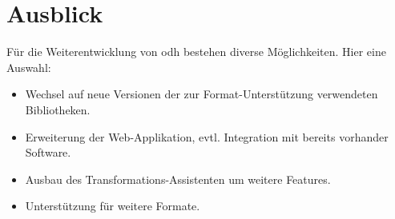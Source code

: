 \section*{Ausblick}
Für die Weiterentwicklung von \acl{odh} bestehen diverse Möglichkeiten. Hier eine Auswahl:
\begin{itemize}
\item Wechsel auf neue Versionen der zur Format-Unterstützung verwendeten Bibliotheken.
\item Erweiterung der Web-Applikation, evtl. Integration mit bereits vorhander Software.
\item Ausbau des Transformations-Assistenten um weitere Features.
\item Unterstützung für weitere Formate.
\end{itemize}
